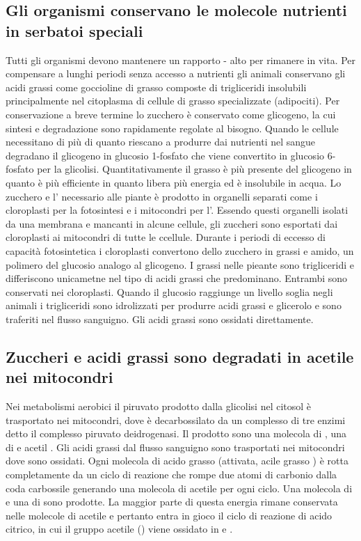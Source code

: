 \subsection{Gli organismi conservano le molecole nutrienti in serbatoi speciali}
Tutti gli organismi devono mantenere un rapporto - alto per rimanere in vita. Per compensare a lunghi periodi senza accesso a nutrienti gli animali conservano gli acidi
grassi come goccioline di grasso composte di trigliceridi insolubili principalmente nel citoplasma di cellule di grasso specializzate (adipociti). Per conservazione a breve termine lo 
zucchero \`e conservato come glicogeno, la cui sintesi e degradazione sono rapidamente regolate al bisogno. Quando le cellule necessitano di pi\`u  di quanto riescano a produrre
dai nutrienti nel sangue degradano il glicogeno in glucosio 1-fosfato che viene convertito in glucosio 6-fosfato per la glicolisi. Quantitativamente il grasso \`e pi\`u presente del
glicogeno in quanto \`e pi\`u efficiente in quanto libera pi\`u energia ed \`e insolubile in acqua. Lo zucchero e l' necessario alle piante \`e prodotto in organelli separati
come i cloroplasti per la fotosintesi e i mitocondri per l'. Essendo questi organelli isolati da una membrana e mancanti in alcune cellule, gli zuccheri sono esportati dai 
cloroplasti ai mitocondri di tutte le ccellule. Durante i periodi di eccesso di capacit\`a fotosintetica i cloroplasti convertono dello zucchero in grassi e amido, un polimero del
glucosio analogo al glicogeno. I grassi nelle pieante sono trigliceridi e differiscono unicametne nel tipo di acidi grassi che predominano. Entrambi sono conservati nei cloroplasti. 
Quando il glucosio raggiunge un livello soglia negli animali i trigliceridi sono idrolizzati per produrre acidi grassi e glicerolo e sono traferiti nel flusso sanguigno. Gli acidi 
grassi sono ossidati direttamente.
\subsection{Zuccheri e acidi grassi sono degradati in acetile  nei mitocondri}
Nei metabolismi aerobici il piruvato prodotto dalla glicolisi nel citosol \`e trasportato nei mitocondri, dove \`e decarbossilato da un complesso di tre enzimi detto il complesso 
piruvato deidrogenasi. Il prodotto sono una molecola di , una di  e acetil . Gli acidi grassi dal flusso sanguigno sono trasportati nei mitocondri dove sono
ossidati. Ogni molecola di acido grasso (attivata, acile grasso ) \`e rotta completamente da un ciclo di reazione che rompe due atomi di carbonio dalla coda carbossile generando
una molecola di acetile  per ogni ciclo. Una molecola di  e una di  sono prodotte. La maggior parte di questa energia rimane conservata nelle molecole di 
acetile  e pertanto entra in gioco il ciclo di reazione di acido citrico, in cui il gruppo acetile () viene ossidato in  e . 
